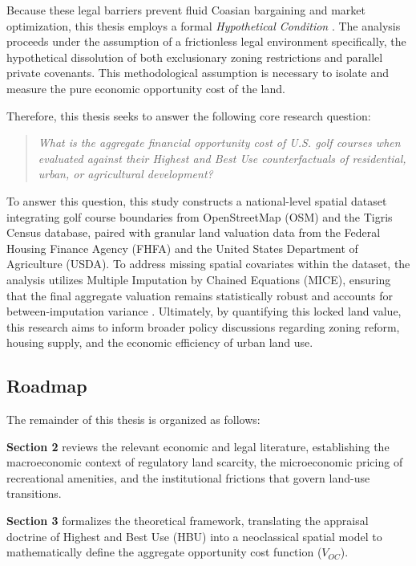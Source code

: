 \documentclass[10pt, letterpaper]{article}
\begin{document}
Because these legal barriers prevent fluid Coasian bargaining and market optimization, this thesis employs a formal \textit{Hypothetical Condition} \parencite{AppraisalInstitute2020}. The analysis proceeds under the assumption of a frictionless legal environment \textemdash specifically, the hypothetical dissolution of both exclusionary zoning restrictions and parallel private covenants. This methodological assumption is necessary to isolate and measure the pure economic opportunity cost of the land.

Therefore, this thesis seeks to answer the following core research question: 

\begin{quote}
\textit{What is the aggregate financial opportunity cost of U.S. golf courses when evaluated against their Highest and Best Use counterfactuals of residential, urban, or agricultural development?}
\end{quote}
\textit{}

To answer this question, this study constructs a national-level spatial dataset integrating golf course boundaries from OpenStreetMap (OSM) and the Tigris Census database, paired with granular land valuation data from the Federal Housing Finance Agency (FHFA) and the United States Department of Agriculture (USDA). To address missing spatial covariates within the dataset, the analysis utilizes Multiple Imputation by Chained Equations (MICE), ensuring that the final aggregate valuation remains statistically robust and accounts for between-imputation variance \parencite{Burren2018, Rubin1987}. Ultimately, by quantifying this locked land value, this research aims to inform broader policy discussions regarding zoning reform, housing supply, and the economic efficiency of urban land use.


\subsection{Roadmap}
The remainder of this thesis is organized as follows: 

\textbf{Section 2} reviews the relevant economic and legal literature, establishing the macroeconomic context of regulatory land scarcity, the microeconomic pricing of recreational amenities, and the institutional frictions that govern land-use transitions. 

\textbf{Section 3} formalizes the theoretical framework, translating the appraisal doctrine of Highest and Best Use (HBU) into a neoclassical spatial model to mathematically define the aggregate opportunity cost function ($V_{OC}$). 
\end{document}
